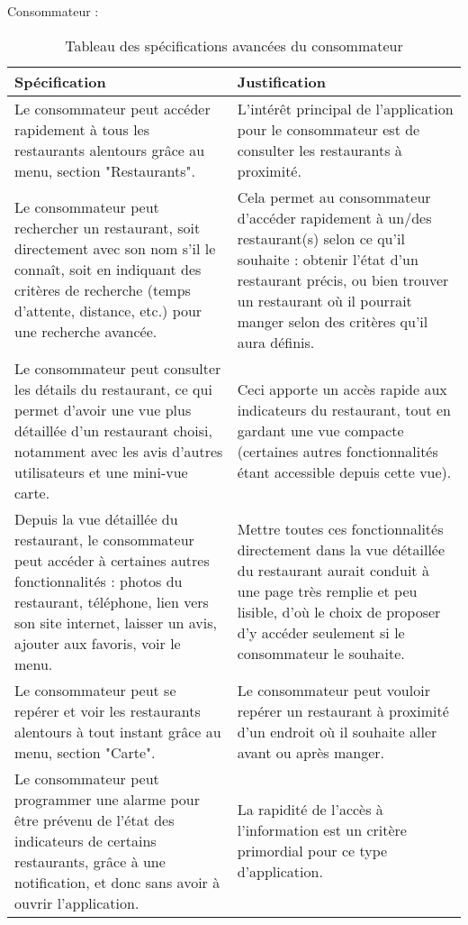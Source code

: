 Consommateur : \\
\begin{table}[H]
    \centering
    \caption{Tableau des spécifications avancées du consommateur}
    \label{min-spec-table}
    \begin{tabular}{p{8cm}|p{8cm}}
 	\bf{Spécification} & \bf{Justification} \\ \hline
		Le consommateur peut accéder rapidement à tous les restaurants alentours grâce au menu, section "Restaurants". & L'intérêt principal de l'application pour le consommateur est de consulter les restaurants à proximité. \\ \hline
		Le consommateur peut rechercher un restaurant, soit directement avec son nom s'il le connaît, soit en indiquant des critères de recherche (temps d'attente, distance, etc.) pour une recherche avancée. & Cela permet au consommateur d'accéder rapidement à un/des restaurant(s) selon ce qu'il souhaite : obtenir l'état d'un restaurant précis, ou bien trouver un restaurant où il pourrait manger selon des critères qu'il aura définis. \\ \hline
		Le consommateur peut consulter les détails du restaurant, ce qui permet d'avoir une vue plus détaillée d'un restaurant choisi, notamment avec les avis d'autres utilisateurs et une mini-vue carte. & Ceci apporte un accès rapide aux indicateurs du restaurant, tout en gardant une vue compacte (certaines autres fonctionnalités étant accessible depuis cette vue). \\ \hline
		Depuis la vue détaillée du restaurant, le consommateur peut accéder à certaines autres fonctionnalités : photos du restaurant, téléphone, lien vers son site internet, laisser un avis, ajouter aux favoris, voir le menu. & Mettre toutes ces fonctionnalités directement dans la vue détaillée du restaurant aurait conduit à une page très remplie et peu lisible, d'où le choix de proposer d'y accéder seulement si le consommateur le souhaite. \\ \hline
		Le consommateur peut se repérer et voir les restaurants alentours à tout instant grâce au menu, section "Carte". & Le consommateur peut vouloir repérer un restaurant à proximité d'un endroit où il souhaite aller avant ou après manger. \\ \hline
		Le consommateur peut programmer une alarme pour être prévenu de l'état des indicateurs de certains restaurants, grâce à une notification, et donc sans avoir à ouvrir l'application. & La rapidité de l'accès à l'information est un critère primordial pour ce type d'application. \\
    \end{tabular}
\end{table}


